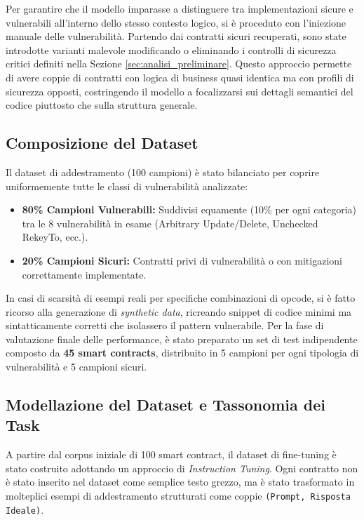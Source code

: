 Per garantire che il modello imparasse a distinguere tra implementazioni sicure e vulnerabili all'interno dello stesso contesto logico, si è proceduto con l'iniezione manuale delle vulnerabilità. Partendo dai contratti sicuri recuperati, sono state introdotte varianti malevole modificando o eliminando i controlli di sicurezza critici definiti nella Sezione \ref{sec:analisi_preliminare}. Questo approccio permette di avere coppie di contratti con logica di business quasi identica ma con profili di sicurezza opposti, costringendo il modello a focalizzarsi sui dettagli semantici del codice piuttosto che sulla struttura generale.

\subsection{Composizione del Dataset}
Il dataset di addestramento (100 campioni) è stato bilanciato per coprire uniformemente tutte le classi di vulnerabilità analizzate:
\begin{itemize}
    \item \textbf{80\% Campioni Vulnerabili:} Suddivisi equamente (10\% per ogni categoria) tra le 8 vulnerabilità in esame (Arbitrary Update/Delete, Unchecked RekeyTo, ecc.).
    \item \textbf{20\% Campioni Sicuri:} Contratti privi di vulnerabilità o con mitigazioni correttamente implementate.
\end{itemize}

In casi di scarsità di esempi reali per specifiche combinazioni di opcode, si è fatto ricorso alla generazione di \textit{synthetic data}, ricreando snippet di codice minimi ma sintatticamente corretti che isolassero il pattern vulnerabile. Per la fase di valutazione finale delle performance, è stato preparato un set di test indipendente composto da \textbf{45 smart contracts}, distribuito in 5 campioni per ogni tipologia di vulnerabilità e 5 campioni sicuri.

\subsection{Modellazione del Dataset e Tassonomia dei Task}
\label{sec:training_tasks}

A partire dal corpus iniziale di 100 smart contract, il dataset di fine-tuning è stato costruito adottando un approccio di \textit{Instruction Tuning}. Ogni contratto non è stato inserito nel dataset come semplice testo grezzo, ma è stato trasformato in molteplici esempi di addestramento strutturati come coppie \texttt{(Prompt, Risposta Ideale)}.

